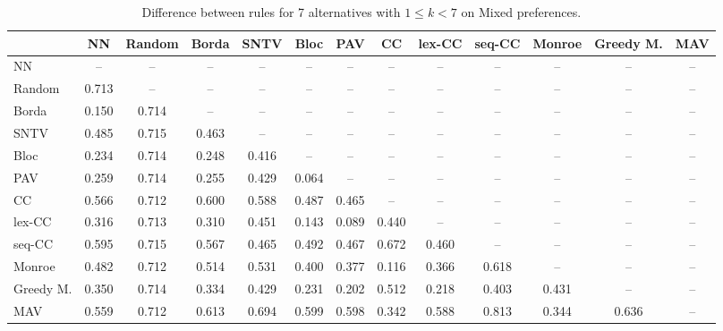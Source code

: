 
\begin{table*}[htbp]
\centering
\begin{tabular}{lcccccccccccc}
\toprule
 & NN & Random & Borda & SNTV & Bloc & PAV & CC & lex-CC & seq-CC & Monroe & Greedy M. & MAV \\
\midrule
NN & -- & -- & -- & -- & -- & -- & -- & -- & -- & -- & -- & -- \\
Random & \cellcolor{blue!71} 0.713 & -- & -- & -- & -- & -- & -- & -- & -- & -- & -- & -- \\
Borda & \cellcolor{blue!15} 0.150 & \cellcolor{blue!71} 0.714 & -- & -- & -- & -- & -- & -- & -- & -- & -- & -- \\
SNTV & \cellcolor{blue!48} 0.485 & \cellcolor{blue!71} 0.715 & \cellcolor{blue!46} 0.463 & -- & -- & -- & -- & -- & -- & -- & -- & -- \\
Bloc & \cellcolor{blue!23} 0.234 & \cellcolor{blue!71} 0.714 & \cellcolor{blue!24} 0.248 & \cellcolor{blue!41} 0.416 & -- & -- & -- & -- & -- & -- & -- & -- \\
PAV & \cellcolor{blue!25} 0.259 & \cellcolor{blue!71} 0.714 & \cellcolor{blue!25} 0.255 & \cellcolor{blue!42} 0.429 & \cellcolor{blue!6} 0.064 & -- & -- & -- & -- & -- & -- & -- \\
CC & \cellcolor{blue!56} 0.566 & \cellcolor{blue!71} 0.712 & \cellcolor{blue!60} 0.600 & \cellcolor{blue!58} 0.588 & \cellcolor{blue!48} 0.487 & \cellcolor{blue!46} 0.465 & -- & -- & -- & -- & -- & -- \\
lex-CC & \cellcolor{blue!31} 0.316 & \cellcolor{blue!71} 0.713 & \cellcolor{blue!31} 0.310 & \cellcolor{blue!45} 0.451 & \cellcolor{blue!14} 0.143 & \cellcolor{blue!8} 0.089 & \cellcolor{blue!44} 0.440 & -- & -- & -- & -- & -- \\
seq-CC & \cellcolor{blue!59} 0.595 & \cellcolor{blue!71} 0.715 & \cellcolor{blue!56} 0.567 & \cellcolor{blue!46} 0.465 & \cellcolor{blue!49} 0.492 & \cellcolor{blue!46} 0.467 & \cellcolor{blue!67} 0.672 & \cellcolor{blue!46} 0.460 & -- & -- & -- & -- \\
Monroe & \cellcolor{blue!48} 0.482 & \cellcolor{blue!71} 0.712 & \cellcolor{blue!51} 0.514 & \cellcolor{blue!53} 0.531 & \cellcolor{blue!40} 0.400 & \cellcolor{blue!37} 0.377 & \cellcolor{blue!11} 0.116 & \cellcolor{blue!36} 0.366 & \cellcolor{blue!61} 0.618 & -- & -- & -- \\
Greedy M. & \cellcolor{blue!35} 0.350 & \cellcolor{blue!71} 0.714 & \cellcolor{blue!33} 0.334 & \cellcolor{blue!42} 0.429 & \cellcolor{blue!23} 0.231 & \cellcolor{blue!20} 0.202 & \cellcolor{blue!51} 0.512 & \cellcolor{blue!21} 0.218 & \cellcolor{blue!40} 0.403 & \cellcolor{blue!43} 0.431 & -- & -- \\
MAV & \cellcolor{blue!55} 0.559 & \cellcolor{blue!71} 0.712 & \cellcolor{blue!61} 0.613 & \cellcolor{blue!69} 0.694 & \cellcolor{blue!59} 0.599 & \cellcolor{blue!59} 0.598 & \cellcolor{blue!34} 0.342 & \cellcolor{blue!58} 0.588 & \cellcolor{blue!81} 0.813 & \cellcolor{blue!34} 0.344 & \cellcolor{blue!63} 0.636 & -- \\
\bottomrule
\end{tabular}

\caption{Difference between rules for 7 alternatives with $1 \leq k < 7$ on Mixed preferences.}
\label{tab:rule_distance_heatmap-m=[7]-pref_dist=mixed}
\end{table*}
    